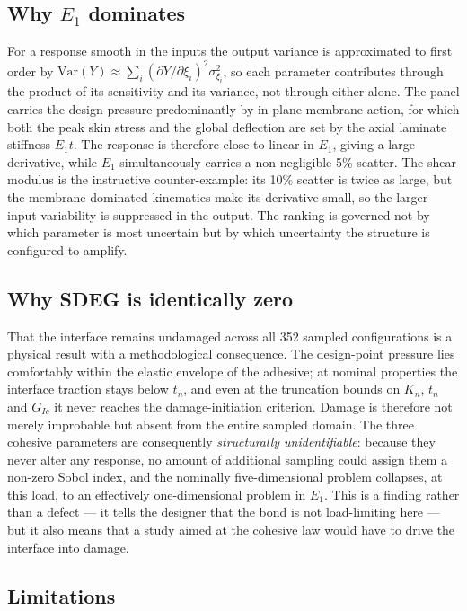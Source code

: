 \documentclass[review,3p,times,12pt,nopreprintline]{elsarticle}
\begin{document}
\subsection{Why $E_1$ dominates}

For a response smooth in the inputs the output variance is approximated to first order by
$\mathrm{Var}(Y)\approx\sum_i(\partial Y/\partial\xi_i)^2\sigma_{\xi_i}^2$, so each
parameter contributes through the product of its sensitivity and its variance, not through
either alone. The panel carries the design pressure predominantly by in-plane membrane
action, for which both the peak skin stress and the global deflection are set by the axial
laminate stiffness $E_1t$. The response is therefore close to linear in $E_1$, giving a
large derivative, while $E_1$ simultaneously carries a non-negligible 5\% scatter. The
shear modulus is the instructive counter-example: its 10\% scatter is twice as large, but
the membrane-dominated kinematics make its derivative small, so the larger input variability
is suppressed in the output. The ranking is governed not by which parameter is most
uncertain but by which uncertainty the structure is configured to amplify.

\subsection{Why SDEG is identically zero}

That the interface remains undamaged across all 352 sampled configurations is a physical
result with a methodological consequence. The design-point pressure lies comfortably within
the elastic envelope of the adhesive; at nominal properties the interface traction stays
below $t_n$, and even at the truncation bounds on $K_n$, $t_n$ and $G_{Ic}$ it never
reaches the damage-initiation criterion. Damage is therefore not merely improbable but
absent from the entire sampled domain. The three cohesive parameters are consequently
\emph{structurally unidentifiable}: because they never alter any response, no amount of
additional sampling could assign them a non-zero Sobol index, and the nominally
five-dimensional problem collapses, at this load, to an effectively one-dimensional problem
in $E_1$. This is a finding rather than a defect --- it tells the designer that the bond is
not load-limiting here --- but it also means that a study aimed at the cohesive law would
have to drive the interface into damage.

\subsection{Limitations}
\label{sec:limits}
\end{document}
